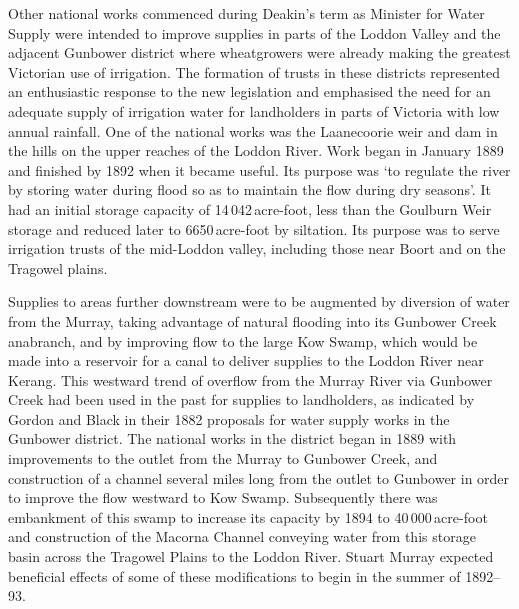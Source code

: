 Other national works commenced during Deakin's term as Minister for
Water Supply were intended to improve supplies in parts of the Loddon
Valley and the adjacent Gunbower district where wheatgrowers were
already making the greatest Victorian use of irrigation.
The formation of trusts in these districts represented an enthusiastic
response to the new legislation and emphasised the need for an
adequate supply of irrigation water for landholders in parts of
Victoria with low annual rainfall.  One of the national works was the
Laanecoorie weir and dam in the hills on the upper reaches of the
Loddon River.  Work began in January 1889 and finished by 1892 when it
became useful.  Its purpose was `to regulate the river by storing
water during flood so as to maintain the flow during dry
seasons'.  It had an initial storage
capacity of 14\,042\,acre-foot, less than the Goulburn Weir storage
and reduced later to 6650\,acre-foot by siltation.  Its purpose was to serve irrigation trusts of the mid-Loddon
valley, including those near Boort and on the Tragowel plains.

Supplies to areas further downstream were to be augmented by diversion
of water from the Murray, taking advantage of natural flooding into
its Gunbower Creek anabranch, and by improving flow to the large Kow
Swamp, which would be made into a reservoir for a canal to deliver
supplies to the Loddon River near Kerang.  This westward trend of overflow
from the Murray River via Gunbower Creek had been used in the past for
supplies to landholders, as indicated by Gordon and Black in their
1882 proposals for water supply works in the Gunbower district.  The
national works in the district began in 1889 with improvements to the
outlet from the Murray to Gunbower Creek, and construction of a
channel several miles long from the outlet to Gunbower in order to
improve the flow westward to Kow Swamp.  Subsequently there was
embankment of this swamp to increase its capacity by 1894 to
40\,000\,acre-foot and construction of the Macorna Channel conveying
water from this storage basin across the Tragowel Plains to the Loddon
River.
Stuart Murray expected beneficial effects of some of these
modifications to begin in the summer of 1892--93.

